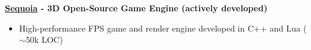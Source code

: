 \textbf{\href{https://github.com/thfabian/sequoia}{Sequoia} - 3D Open-Source Game Engine (actively developed)}
\begin{itemize}
 \item High-performance FPS game and render engine developed in C++ and Lua ($\sim$50k LOC)
\end{itemize}
